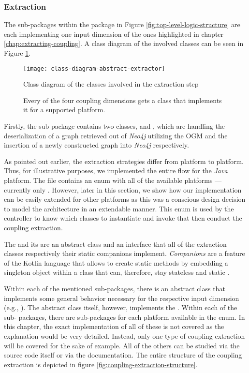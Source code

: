 \documentclass[12pt,a4paper]{report}
\begin{document}
\subsubsection{Extraction}
The sub-packages within the package 
in Figure \ref{fig:top-level-logic-structure} are each
implementing one input dimension of the ones highlighted in chapter
\ref{chap:extracting-coupling}.
A class diagram of the involved classes can be seen in
Figure \ref{fig:class-diagram-abstract-extractor}.

\begin{figure}[htbp]
\centering
\texttt{[image: class-diagram-abstract-extractor]}
\caption{Class diagram of the classes involved in the extraction step}
\caption*{\centering
  Every of the four coupling dimensions gets a class that implements it
  for a supported platform.
}
\label{fig:class-diagram-abstract-extractor}
\end{figure}

Firstly, the sub-package  contains two classes,
 and , which are handling the
deserialization of a graph retrieved out of \textit{Neo4j} utilizing the OGM
and the insertion of a newly constructed graph into \textit{Neo4j}
respectively.

As pointed out earlier, the extraction strategies differ from platform to
platform. Thus, for illustrative purposes, we implemented the entire flow for
the \textit{Java} platform. The  file contains an enum with
all of the available platforms --- currently only . However, later
in this section, we show how our implementation can be easily extended for
other platforms as this was a conscious design decision to model the
architecture in an extendable manner. This enum is used by the controller to
know which classes to instantiate and invoke that then conduct the coupling
extraction.

The  and its  are an
abstract class and an interface that all of the extraction classes respectively
their static companions implement. \textit{Companions} are a feature of the
Kotlin language that allows to create static methods by embedding a singleton
object within a class that can, therefore, stay stateless and static
\cite{kotlin-companions}.

Within each of the mentioned sub-packages, there is an abstract class that
implements some general behavior necessary for the respective input dimension
(e.g., ). The abstract class itself,
however, implements the . Within each of the sub\hyp
packages, there are sub-packages for each platform available in the
 enum. In this chapter, the exact implementation of all of these
is not covered as the explanation would be very detailed. Instead, only one type
of coupling extraction will be covered for the sake of example. All of the
others can be studied via the source code itself or via the documentation.
The entire structure of the coupling extraction is depicted in figure
\ref{fig:coupling-extraction-structure}.
\end{document}
